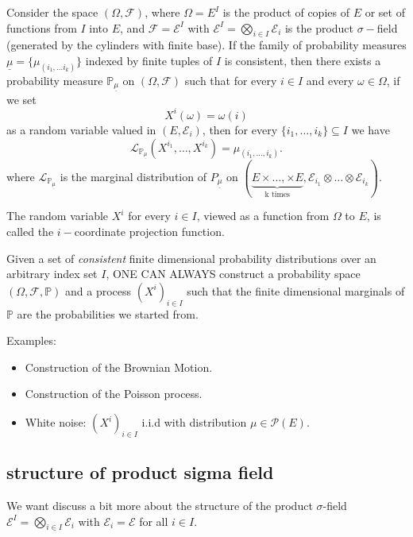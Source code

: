 \begin{theorem}
	Consider the space $(\Omega, \mathcal{F})$, where $\Omega = E^I$ is the product of copies of $E$ or set of functions from $I$ into $E$, and $\mathcal{F} = \mathcal{E}^I$ with $\mathcal{E}^I = \bigotimes_{i \in I} \mathcal{E}_i$ is the product $\sigma-$field (generated by the cylinders with finite base). If the family of probability measures $\underline{\mu} = \{ \mu_{(i_1,\ldots i_k)} \}$ indexed by finite tuples of $I$ is consistent, then there exists a probability measure $\mathbb{P}_{\underline{\mu}}$ on $(\Omega, \mathcal{F})$ such that for every $i\in I$ and every $\omega \in \Omega$, if we set 
	$$X^i(\omega) = \omega(i)$$
	as a random variable valued in $(E, \mathcal{E}_i)$, then for every $\{i_1, \ldots, i_k\} \subseteq I$ we have
	$$
		\mathcal{L}_{\mathbb{P}_{\underline{\mu}}}(X^{i_1}, \ldots, X^{i_k}) = \mu_{(i_1, \ldots, i_k)}.
	$$
	where $\mathcal{L}_{\mathbb{P}_{\underline{\mu}}}$ is the marginal distribution of $P_{\underline{\mu}}$ on $(\underbrace{ E\times \ldots,\times E}_\text{k times}, \mathcal{E}_{i_1} \otimes \ldots \otimes \mathcal{E}_{i_k})$.
	
\end{theorem}

\begin{definition}
	The random variable $X^i$ for every $i \in I$, viewed as a function from $\Omega$ to $E$, is called the $i-$coordinate projection function.
\end{definition}


\begin{remark}
	Given a set of \textit{consistent} finite dimensional probability distributions over an arbitrary index set $I$, ONE CAN ALWAYS construct a probability space $(\Omega, \mathcal{F},\mathbb{P})$ and a process $(X^i)_{i \in I}$ such that the finite dimensional marginals of $\mathbb{P}$ are the probabilities we started from.
\end{remark}

Examples:
\begin{itemize}
	\item Construction of the Brownian Motion.
	\item Construction of the Poisson process.
	\item White noise: $(X^i)_{i\in I}$ i.i.d with distribution $\mu \in \mathcal{P}(E)$.
\end{itemize}


\subsection{structure of product sigma field}
We want discuss a bit more about the structure of the product $\sigma$-field $\mathcal{E}^I = \bigotimes_{i \in I} \mathcal{E}_i$ with $\mathcal{E}_i = \mathcal{E}$ for all $i \in I$. 

